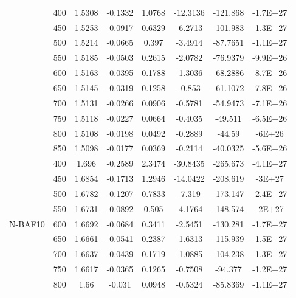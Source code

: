 {\begin{longtable}{cccccccc}
\bottomrule
\endfoot
\multirow{10}{*}{N-BK7}   & 400 & 1.5308 & -0.1332 & 1.0768 & -12.3136 & -121.868 & -1.7E+27 \\
                          & 450 & 1.5253 & -0.0917 & 0.6329 & -6.2713  & -101.983 & -1.3E+27 \\
                          & 500 & 1.5214 & -0.0665 & 0.397  & -3.4914  & -87.7651 & -1.1E+27 \\
                          & 550 & 1.5185 & -0.0503 & 0.2615 & -2.0782  & -76.9379 & -9.9E+26 \\
                          & 600 & 1.5163 & -0.0395 & 0.1788 & -1.3036  & -68.2886 & -8.7E+26 \\
                          & 650 & 1.5145 & -0.0319 & 0.1258 & -0.853   & -61.1072 & -7.8E+26 \\
                          & 700 & 1.5131 & -0.0266 & 0.0906 & -0.5781  & -54.9473 & -7.1E+26 \\
                          & 750 & 1.5118 & -0.0227 & 0.0664 & -0.4035  & -49.511  & -6.5E+26 \\
                          & 800 & 1.5108 & -0.0198 & 0.0492 & -0.2889  & -44.59   & -6E+26   \\
                          & 850 & 1.5098 & -0.0177 & 0.0369 & -0.2114  & -40.0325 & -5.6E+26 \\ \hline
\multirow{10}{*}{N-BAF10} & 400 & 1.696  & -0.2589 & 2.3474 & -30.8435 & -265.673 & -4.1E+27 \\
                          & 450 & 1.6854 & -0.1713 & 1.2946 & -14.0422 & -208.619 & -3E+27   \\
                          & 500 & 1.6782 & -0.1207 & 0.7833 & -7.319   & -173.147 & -2.4E+27 \\
                          & 550 & 1.6731 & -0.0892 & 0.505  & -4.1764  & -148.574 & -2E+27   \\
                          & 600 & 1.6692 & -0.0684 & 0.3411 & -2.5451  & -130.281 & -1.7E+27 \\
                          & 650 & 1.6661 & -0.0541 & 0.2387 & -1.6313  & -115.939 & -1.5E+27 \\
                          & 700 & 1.6637 & -0.0439 & 0.1719 & -1.0885  & -104.238 & -1.3E+27 \\
                          & 750 & 1.6617 & -0.0365 & 0.1265 & -0.7508  & -94.377  & -1.2E+27 \\
                          & 800 & 1.66   & -0.031  & 0.0948 & -0.5324  & -85.8369 & -1.1E+27 \\

\end{longtable}}
